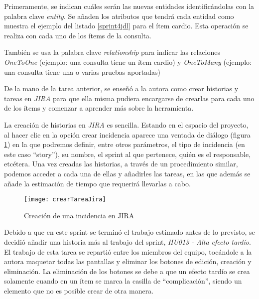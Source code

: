 Primeramente, se indican cuáles serán las nuevas entidades identificándolas con la palabra clave \emph{entity}. Se añaden los atributos que tendrá cada entidad como muestra el ejemplo del listado \ref{sprint4jdl} para el ítem cardio. Esta operación se realiza con cada uno de los ítems de la consulta.

También se usa la palabra clave \emph{relationship} para indicar las relaciones \emph{OneToOne} (ejemplo: una consulta tiene un ítem cardio) y \emph{OneToMany} (ejemplo: una consulta tiene una o varias pruebas aportadas)



De la mano de la tarea anterior, se enseñó a la autora como crear historias y tareas en \emph{JIRA} para que ella misma pudiera encargarse de crearlas para cada uno de los ítems y comenzar a aprender más sobre la herramienta.

La creación de historias en \emph{JIRA} es sencilla. Estando en el espacio del proyecto, al hacer clic en la opción crear incidencia aparece una ventada de diálogo (figura \ref{fig:crearTareaJira}) en la que podremos definir, entre otros parámetros, el tipo de incidencia (en este caso ``story''), su nombre, el sprint al que pertenece, quién es el responsable, etcétera. Una vez creadas las historias, a través de un procedimiento similar, podemos acceder a cada una de ellas y añadirles las tareas, en las que además se añade la estimación de tiempo que requerirá llevarlas a cabo.

\begin{figure}[!h]
\begin{center}
\texttt{[image: crearTareaJira]}
\caption{Creación de una incidencia en JIRA}
\label{fig:crearTareaJira}
\end{center}
\end{figure}

Debido a que en este sprint se terminó el trabajo estimado antes de lo previsto, se decidió añadir una historia más al trabajo del sprint, \emph{HU013 - Alta efecto tardío}. El trabajo de esta tarea se repartió entre los miembros del equipo, tocándole a la autora maquetar todas las pantallas y eliminar los botones de edición, creación y eliminación. La eliminación de los botones se debe a que un efecto tardío se crea solamente cuando en un ítem se marca la casilla de ``complicación'', siendo un elemento que no es posible crear de otra manera.

